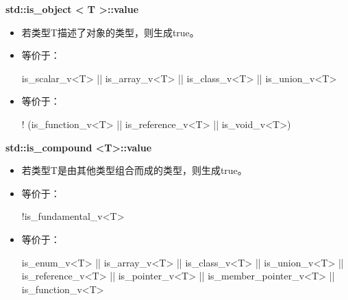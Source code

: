 \textbf{std::is\_object < T >::value}

\begin{itemize}
\item 
若类型T描述了对象的类型，则生成true。

\item 
等价于： 
\begin{cpp}
is_scalar_v<T> || is_array_v<T> || is_class_v<T> || is_union_v<T>
\end{cpp}

\item
等价于： 
\begin{cpp}
! (is_function_v<T> || is_reference_v<T> || is_void_v<T>)
\end{cpp}
\end{itemize}

\textbf{std::is\_compound <T>::value}

\begin{itemize}
\item 
若类型T是由其他类型组合而成的类型，则生成true。

\item 
等价于： 
\begin{cpp}
!is_fundamental_v<T>
\end{cpp}

\item
等价于： 
\begin{cpp}
is_enum_v<T> || is_array_v<T> || is_class_v<T> || is_union_v<T>
|| is_reference_v<T> || is_pointer_v<T> || is_member_pointer_v<T>
|| is_function_v<T>
\end{cpp}
\end{itemize}



